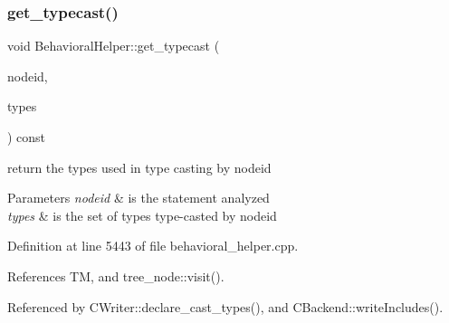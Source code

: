 \subsubsection{\texorpdfstring{get\+\_\+typecast()}{get\_typecast()}}
{\footnotesize\ttfamily void Behavioral\+Helper\+::get\+\_\+typecast (\begin{DoxyParamCaption}\item[{unsigned int}]{nodeid,  }\item[{\hyperlink{classCustomUnorderedSet}{Custom\+Unordered\+Set}$<$ unsigned int $>$ \&}]{types }\end{DoxyParamCaption}) const\hspace{0.3cm}{\ttfamily [virtual]}}



return the types used in type casting by nodeid 


\begin{DoxyParams}{Parameters}
{\em nodeid} & is the statement analyzed \\
\hline
{\em types} & is the set of types type-\/casted by nodeid \\
\hline
\end{DoxyParams}


Definition at line 5443 of file behavioral\+\_\+helper.\+cpp.



References TM, and tree\+\_\+node\+::visit().



Referenced by C\+Writer\+::declare\+\_\+cast\+\_\+types(), and C\+Backend\+::write\+Includes().

